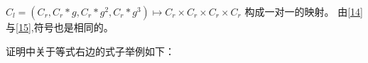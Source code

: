 \documentclass{amsc}          %
\numberwithin{equation}{section} %
\begin{document}
\begin{prof}
$C_{l}=(C_{r},C_{r}*g,C_{r}*g^2,C_{r}*g^3) \mapsto C_{r}\times C_{r}\times C_{r} \times C_{r}$
构成一对一的映射。
由\ref{14}与\ref{15},符号也是相同的。

\end{prof}

证明中关于等式右边的式子举例如下：
\end{document}
